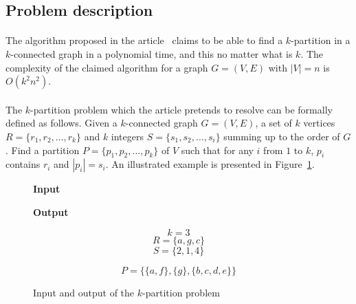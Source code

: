 \subsection{Problem description}
\paragraph{}
The algorithm proposed in the article~\cite{JS94} claims to be able to find
a $k$-partition in a $k$-connected graph in a polynomial time, and this no
matter what is $k$. The complexity of the claimed algorithm for a graph
$G = (V,E)$ with $|V| = n$ is $O(k^2 n^2)$.

\paragraph{}
The $k$-partition problem which the article pretends to resolve can be
formally defined as follows. Given a $k$-connected graph $G = (V,E)$, a set of
$k$ vertices $R = \{r_1, r_2, \dots, r_k \}$ and $k$ integers
$S = \{s_1,s_2, \dots, s_i\}$ summing up to the order of $G$. Find a partition
$P = \{p_1, p_2, \dots, p_k \}$ of $V$ such that for any $i$ from $1$ to $k$,
$p_i$ contains $r_i$ and $|p_i| = s_i$. An illustrated example is presented in
Figure~\ref{fig:inputOutput}.

\newcommand{\formalTitle}[1]{\textbf{\large #1}\vspace{0.5cm}}

\begin{figure}[H]
  \caption{\label{fig:inputOutput}Input and output of the $k$-partition
    problem}
  \vspace{0.5cm}
  \begin{minipage}{.5\textwidth}
    \begin{center}
      \formalTitle{Input}\\
      \begin{tikzpicture}[x=.06\textwidth, y=.06\textwidth,transform shape]
        
      \end{tikzpicture}
    \end{center}
  \end{minipage}
  \begin{minipage}{.5\textwidth}
    \begin{center}
      \formalTitle{Output}\\
      \begin{tikzpicture}[x=.06\textwidth, y=.06\textwidth,transform shape]
        
      \end{tikzpicture}
    \end{center}
  \end{minipage}
  \begin{minipage}{.5\textwidth}
    $$k = 3$$
    $$R = \{a,g,c\}$$
    $$S = \{2,1,4\}$$
  \end{minipage}
  \begin{minipage}{.5\textwidth}
    $$P = \big\{\{a, f\},\{g\},\{b, c, d, e\}\big\}$$
  \end{minipage}
\end{figure}

